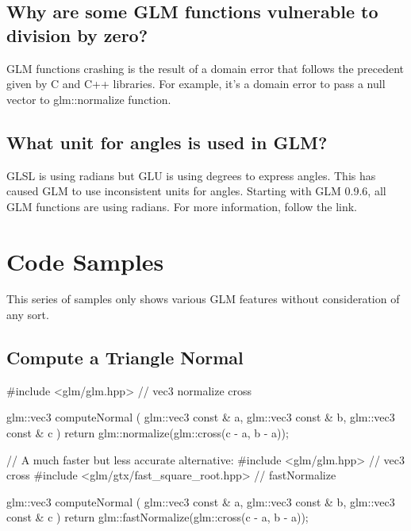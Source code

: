 \documentclass{scrartcl}
\numberwithin{figure}{subsection}
\begin{document}
\subsection{Why are some GLM functions vulnerable to division by zero?}

GLM functions crashing is the result of a domain error that follows the precedent given by C and C++ libraries. For example, it's a domain error to pass a null vector to glm::normalize function.

\subsection{What unit for angles is used in GLM?}

GLSL is using radians but GLU is using degrees to express angles. This has caused GLM to use inconsistent units for angles. Starting with GLM 0.9.6, all GLM functions are using radians. For more information, follow the link.

\newpage{}

\section{Code Samples}

This series of samples only shows various GLM features without consideration of any sort.

\subsection{Compute a Triangle Normal}

\begin{cppcode}
#include <glm/glm.hpp> // vec3 normalize cross

glm::vec3 computeNormal
(
  glm::vec3 const & a, 
  glm::vec3 const & b,
  glm::vec3 const & c
)
{
  return glm::normalize(glm::cross(c - a, b - a));
}
\end{cppcode}

\begin{cppcode}
// A much faster but less accurate alternative:
#include <glm/glm.hpp> // vec3 cross
#include <glm/gtx/fast_square_root.hpp> // fastNormalize

glm::vec3 computeNormal
(
  glm::vec3 const & a, 
  glm::vec3 const & b,
  glm::vec3 const & c
)
{
  return glm::fastNormalize(glm::cross(c - a, b - a));
}
\end{cppcode}

\iffalse
\end{document}
